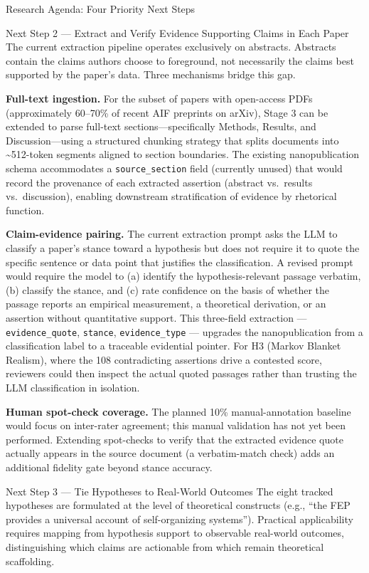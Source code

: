 \documentclass[
  ignorenonframetext,
]{beamer}
\begin{document}
\begin{frame}{Research Agenda: Four Priority
Next Steps \label{sec:next_steps}}
\begin{block}{Next Step 2 --- Extract and Verify Evidence Supporting
Claims in Each Paper}
\protect{}\label{next-step-2-extract-and-verify-evidence-supporting-claims-in-each-paper}
The current extraction pipeline operates exclusively on abstracts.
Abstracts contain the claims authors choose to foreground, not
necessarily the claims best supported by the paper's data. Three
mechanisms bridge this gap.

\textbf{Full-text ingestion.} For the subset of papers with open-access
PDFs (approximately 60--70\% of recent AIF preprints on arXiv), Stage 3
can be extended to parse full-text sections---specifically Methods,
Results, and Discussion---using a structured chunking strategy that
splits documents into \textasciitilde512-token segments aligned to
section boundaries. The existing nanopublication schema accommodates a
\texttt{source\_section} field (currently unused) that would record the
provenance of each extracted assertion (abstract vs.~results
vs.~discussion), enabling downstream stratification of evidence by
rhetorical function.

\textbf{Claim-evidence pairing.} The current extraction prompt asks the
LLM to classify a paper's stance toward a hypothesis but does not
require it to quote the specific sentence or data point that justifies
the classification. A revised prompt would require the model to (a)
identify the hypothesis-relevant passage verbatim, (b) classify the
stance, and (c) rate confidence on the basis of whether the passage
reports an empirical measurement, a theoretical derivation, or an
assertion without quantitative support. This three-field extraction ---
\texttt{evidence\_quote}, \texttt{stance}, \texttt{evidence\_type} ---
upgrades the nanopublication from a classification label to a traceable
evidential pointer. For H3 (Markov Blanket Realism), where the 108
contradicting assertions drive a contested score, reviewers could then
inspect the actual quoted passages rather than trusting the LLM
classification in isolation.

\textbf{Human spot-check coverage.} The planned 10\% manual-annotation
baseline would focus on inter-rater agreement; this manual validation
has not yet been performed. Extending spot-checks to verify that the
extracted evidence quote actually appears in the source document (a
verbatim-match check) adds an additional fidelity gate beyond stance
accuracy.
\end{block}

\begin{block}{Next Step 3 --- Tie Hypotheses to Real-World Outcomes}
\protect{}\label{next-step-3-tie-hypotheses-to-real-world-outcomes}
The eight tracked hypotheses are formulated at the level of theoretical
constructs (e.g., ``the FEP provides a universal account of
self-organizing systems''). Practical applicability requires mapping
from hypothesis support to observable real-world outcomes,
distinguishing which claims are actionable from which remain theoretical
scaffolding.


\end{block}
\end{frame}
\end{document}
